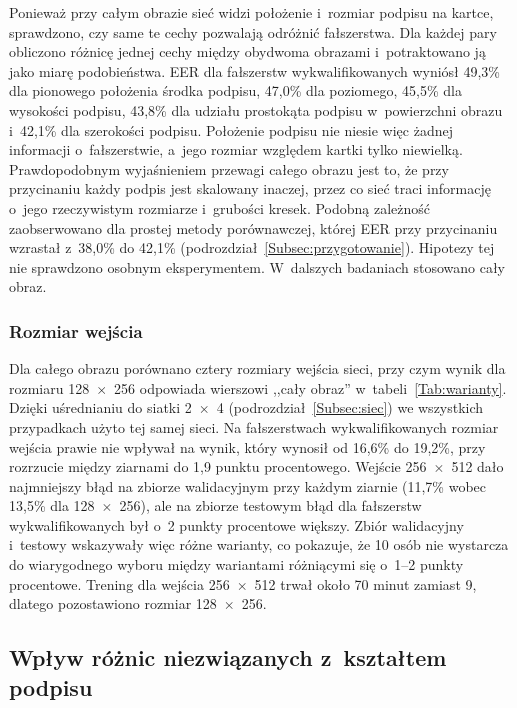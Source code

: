 \documentclass[12pt, twoside, openright]{article}
\begin{document}
Ponieważ przy całym obrazie sieć widzi położenie i~rozmiar podpisu na kartce, sprawdzono, czy same te cechy pozwalają odróżnić fałszerstwa.
Dla każdej pary obliczono różnicę jednej cechy między obydwoma obrazami i~potraktowano ją jako miarę podobieństwa.
EER dla fałszerstw wykwalifikowanych wyniósł 49,3\% dla pionowego położenia środka podpisu, 47,0\% dla poziomego, 45,5\% dla wysokości podpisu, 43,8\% dla udziału prostokąta podpisu w~powierzchni obrazu i~42,1\% dla szerokości podpisu.
Położenie podpisu nie niesie więc żadnej informacji o~fałszerstwie, a~jego rozmiar względem kartki tylko niewielką.
Prawdopodobnym wyjaśnieniem przewagi całego obrazu jest to, że przy przycinaniu każdy podpis jest skalowany inaczej, przez co sieć traci informację o~jego rzeczywistym rozmiarze i~grubości kresek.
Podobną zależność zaobserwowano dla prostej metody porównawczej, której EER przy przycinaniu wzrastał z~38,0\% do 42,1\% (podrozdział~\ref{Subsec:przygotowanie}).
Hipotezy tej nie sprawdzono osobnym eksperymentem.
W~dalszych badaniach stosowano cały obraz.

\subsubsection*{Rozmiar wejścia}

Dla całego obrazu porównano cztery rozmiary wejścia sieci, przy czym wynik dla rozmiaru 128~$\times$~256 odpowiada wierszowi ,,cały obraz'' w~tabeli~\ref{Tab:warianty}.
Dzięki uśrednianiu do siatki 2~$\times$~4 (podrozdział~\ref{Subsec:siec}) we wszystkich przypadkach użyto tej samej sieci.
Na fałszerstwach wykwalifikowanych rozmiar wejścia prawie nie wpływał na wynik, który wynosił od 16,6\% do 19,2\%, przy rozrzucie między ziarnami do 1,9 punktu procentowego.
Wejście 256~$\times$~512 dało najmniejszy błąd na zbiorze walidacyjnym przy każdym ziarnie (11,7\% wobec 13,5\% dla 128~$\times$~256), ale na zbiorze testowym błąd dla fałszerstw wykwalifikowanych był o~2 punkty procentowe większy.
Zbiór walidacyjny i~testowy wskazywały więc różne warianty, co pokazuje, że 10 osób nie wystarcza do wiarygodnego wyboru między wariantami różniącymi się o~1--2 punkty procentowe.
Trening dla wejścia 256~$\times$~512 trwał około 70 minut zamiast 9, dlatego pozostawiono rozmiar 128~$\times$~256.

\subsection{Wpływ różnic niezwiązanych z~kształtem podpisu}
\label{Subsec:wycieki}
\end{document}
